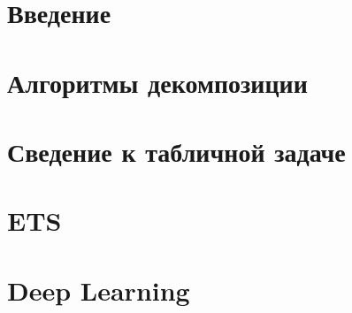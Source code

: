 \documentclass[a4paper,12pt]{book}
\begin{document}
\raggedbottom
{}
\hfuzz=50pt
\newpage
\tableofcontents

\newpage
\chapter{Введение}
\setcounter{figure}{0}


\newpage
\chapter{Алгоритмы декомпозиции}
\setcounter{figure}{0}


\newpage
\chapter{Сведение к табличной задаче}
\setcounter{figure}{0}


\newpage
\chapter{ETS}
\setcounter{figure}{0}


\newpage
\chapter{Deep Learning}
\setcounter{figure}{0}


\newpage
\end{document}
